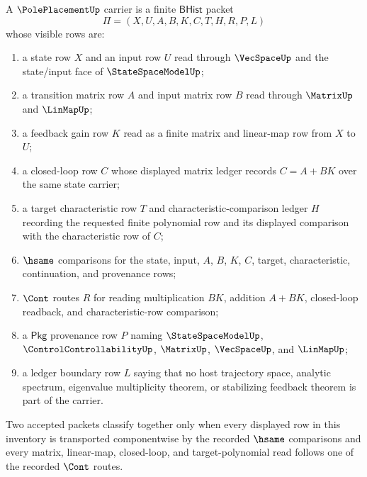\begin{definition}
\label{def:poleplacement-carrier}
A $\PolePlacementUp$ carrier is a finite $\mathsf{BHist}$ packet
$$
\Pi=(X,U,A,B,K,C,T,H,R,P,L)
$$
whose visible rows are:
\begin{enumerate}
\item a state row $X$ and an input row $U$ read through $\VecSpaceUp$ and the
state/input face of $\StateSpaceModelUp$;
\item a transition matrix row $A$ and input matrix row $B$ read through
$\MatrixUp$ and $\LinMapUp$;
\item a feedback gain row $K$ read as a finite matrix and linear-map row from
$X$ to $U$;
\item a closed-loop row $C$ whose displayed matrix ledger records
$C=A+BK$ over the same state carrier;
\item a target characteristic row $T$ and characteristic-comparison ledger $H$
recording the requested finite polynomial row and its displayed comparison
with the characteristic row of $C$;
\item $\hsame$ comparisons for the state, input, $A$, $B$, $K$, $C$, target,
characteristic, continuation, and provenance rows;
\item $\Cont$ routes $R$ for reading multiplication $BK$, addition $A+BK$,
closed-loop readback, and characteristic-row comparison;
\item a $\mathsf{Pkg}$ provenance row $P$ naming $\StateSpaceModelUp$,
$\ControlControllabilityUp$, $\MatrixUp$, $\VecSpaceUp$, and $\LinMapUp$;
\item a ledger boundary row $L$ saying that no host trajectory space, analytic
spectrum, eigenvalue multiplicity theorem, or stabilizing feedback theorem is
part of the carrier.
\end{enumerate}
Two accepted packets classify together only when every displayed row in this
inventory is transported componentwise by the recorded $\hsame$ comparisons
and every matrix, linear-map, closed-loop, and target-polynomial read follows
one of the recorded $\Cont$ routes.
\end{definition}

